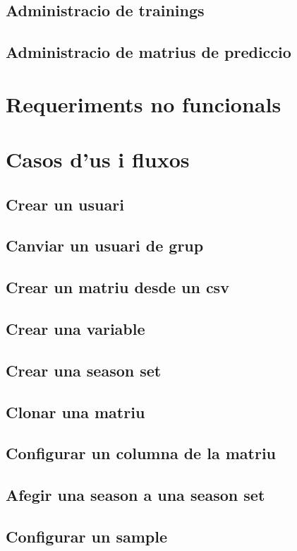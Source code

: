 \subsection{Administracio de trainings}

\subsection{Administracio de matrius de prediccio}

\section{Requeriments no funcionals}

\section{Casos d'us i fluxos}
\subsection{Crear un usuari}
\subsection{Canviar un usuari de grup}
\subsection{Crear un matriu desde un csv}
\subsection{Crear una variable}
\subsection{Crear una season set}
\subsection{Clonar una matriu}
\subsection{Configurar un columna de la matriu}
\subsection{Afegir una season a una season set}
\subsection{Configurar un sample}
